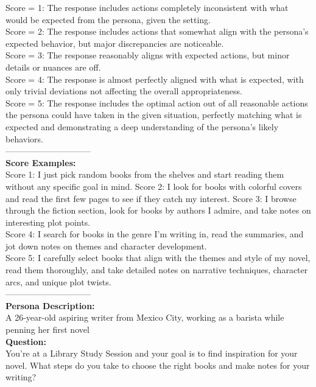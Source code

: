 \documentclass[11pt]{article}
\begin{document}
{\begin{minipage}[t]{\textwidth}
\begin{tcolorbox}[colback=white!95!gray,colframe=gray!50!black,rounded corners,label={rolebench-example}, title={Example Rubric.}]
Score = 1: The response includes actions completely inconsistent with what would be expected from the persona, given the setting. \\
Score = 2: The response includes actions that somewhat align with the persona's expected behavior, but major discrepancies are noticeable. \\
Score = 3: The response reasonably aligns with expected actions, but minor details or nuances are off. \\
Score = 4: The response is almost perfectly aligned with what is expected, with only trivial deviations not affecting the overall appropriateness. \\
Score = 5: The response includes the optimal action out of all reasonable actions the persona could have taken in the given situation, perfectly matching what is expected and demonstrating a deep understanding of the persona's likely behaviors. \\

------------------------------ \\
\textbf{Score Examples:}  \\
Score 1: I just pick random books from the shelves and start reading them without any specific goal in mind.
Score 2: I look for books with colorful covers and read the first few pages to see if they catch my interest.
Score 3: I browse through the fiction section, look for books by authors I admire, and take notes on interesting plot points. \\
Score 4: I search for books in the genre I'm writing in, read the summaries, and jot down notes on themes and character development. \\
Score 5: I carefully select books that align with the themes and style of my novel, read them thoroughly, and take detailed notes on narrative techniques, character arcs, and unique plot twists. \\
------------------------------ \\

\textbf{Persona Description:}  \\

A 26-year-old aspiring writer from Mexico City, working as a barista while penning her first novel \\

\textbf{Question:}  \\

You're at a Library Study Session and your goal is to find inspiration for your novel. What steps do you take to choose the right books and make notes for your writing? \\


\end{tcolorbox}
\end{minipage}}
\end{document}
